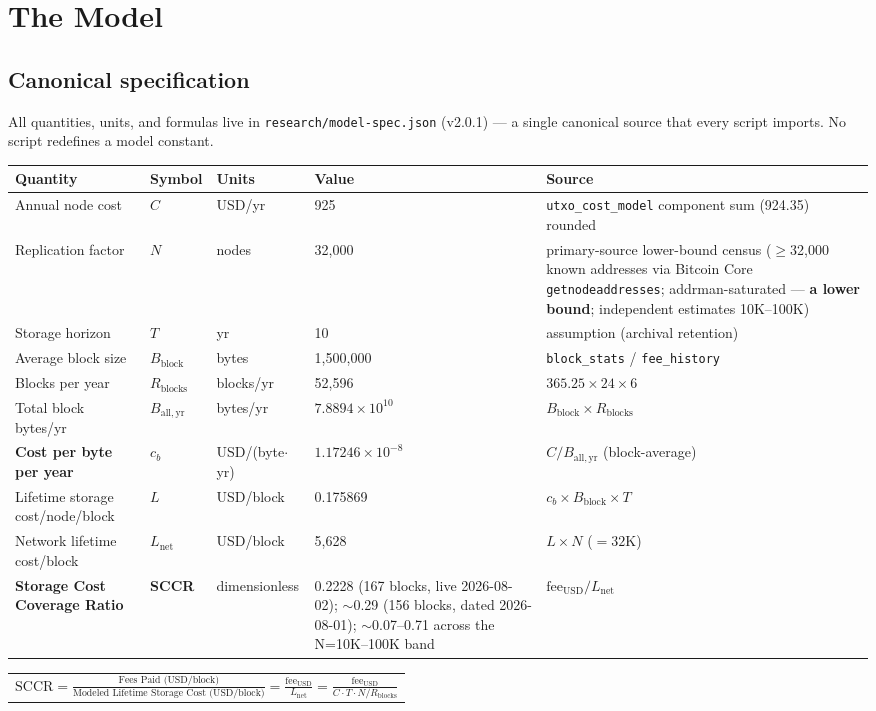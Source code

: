 \documentclass[11pt]{article}
\begin{document}
\section{The Model}\label{sec:4}
\subsection{Canonical specification}\label{sec:4.1}
All quantities, units, and formulas live in \texttt{research/model-spec.json} (v2.0.1) --- a single canonical source that every script imports. No script redefines a model constant.
\begin{center}
\renewcommand{\arraystretch}{1.25}
\begin{tabular}{lllll}
\toprule
Quantity & Symbol & Units & Value & Source \\
\midrule
Annual node cost & $C$ & USD/yr & 925 & \texttt{utxo\_cost\_model} component sum (924.35) rounded \\
Replication factor & $N$ & nodes & 32{,}000 & primary-source lower-bound census ($\geq$32{,}000 known addresses via Bitcoin Core \texttt{getnodeaddresses}; addrman-saturated --- \textbf{a lower bound}; independent estimates 10K--100K) \\
Storage horizon & $T$ & yr & 10 & assumption (archival retention) \\
Average block size & $B_{\mathrm{block}}$ & bytes & 1{,}500{,}000 & \texttt{block\_stats} / \texttt{fee\_history} \\
Blocks per year & $R_{\mathrm{blocks}}$ & blocks/yr & 52{,}596 & $365.25 \times 24 \times 6$ \\
Total block bytes/yr & $B_{\mathrm{all,yr}}$ & bytes/yr & $7.8894\times10^{10}$ & $B_{\mathrm{block}} \times R_{\mathrm{blocks}}$ \\
\textbf{Cost per byte per year} & \textbf{$c_b$} & USD/(byte$\cdot$yr) & \textbf{$1.17246\times10^{-8}$} & $C / B_{\mathrm{all,yr}}$ (block-average) \\
Lifetime storage cost/node/block & $L$ & USD/block & 0.175869 & $c_b \times B_{\mathrm{block}} \times T$ \\
Network lifetime cost/block & $L_{\mathrm{net}}$ & USD/block & 5{,}628 & $L \times N$ ($=32$K) \\
\textbf{Storage Cost Coverage Ratio} & \textbf{SCCR} & dimensionless & 0.2228 (167 blocks, live 2026-08-02); $\sim$0.29 (156 blocks, dated 2026-08-01); $\sim$0.07--0.71 across the N=10K--100K band & $\mathrm{fee}_{\mathrm{USD}} / L_{\mathrm{net}}$ \\
\bottomrule
\end{tabular}
\end{center}
\begin{center}
\renewcommand{\arraystretch}{1.5}
\begin{tabular}{c}
\rule{0pt}{14pt}$\displaystyle \mathrm{SCCR} = \frac{\text{Fees Paid (USD/block)}}{\text{Modeled Lifetime Storage Cost (USD/block)}} = \frac{\mathrm{fee}_{\mathrm{USD}}}{L_{\mathrm{net}}} = \frac{\mathrm{fee}_{\mathrm{USD}}}{C \cdot T \cdot N / R_{\mathrm{blocks}}}$\rule{0pt}{14pt}
\end{tabular}
\end{center}
\end{document}
